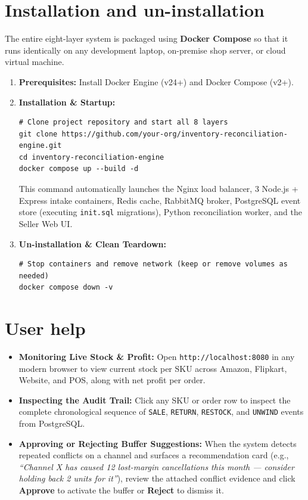 \documentclass[oneside,a4paper,12pt]{report}
\begin{document}
\section{Installation and un-installation}
The entire eight-layer system is packaged using \textbf{Docker Compose} so that it runs identically on any development laptop, on-premise shop server, or cloud virtual machine.
\begin{enumerate}
  \item \textbf{Prerequisites:} Install Docker Engine (v24+) and Docker Compose (v2+).
  \item \textbf{Installation \& Startup:}
  \begin{lstlisting}
# Clone project repository and start all 8 layers
git clone https://github.com/your-org/inventory-reconciliation-engine.git
cd inventory-reconciliation-engine
docker compose up --build -d
  \end{lstlisting}
  This command automatically launches the Nginx load balancer, 3 Node.js + Express intake containers, Redis cache, RabbitMQ broker, PostgreSQL event store (executing \texttt{init.sql} migrations), Python reconciliation worker, and the Seller Web UI.
  \item \textbf{Un-installation \& Clean Teardown:}
  \begin{lstlisting}
# Stop containers and remove network (keep or remove volumes as needed)
docker compose down -v
  \end{lstlisting}
\end{enumerate}

\section{User help}
\begin{itemize}
  \item \textbf{Monitoring Live Stock \& Profit:} Open \texttt{http://localhost:8080} in any modern browser to view current stock per SKU across Amazon, Flipkart, Website, and POS, along with net profit per order.
  \item \textbf{Inspecting the Audit Trail:} Click any SKU or order row to inspect the complete chronological sequence of \texttt{SALE}, \texttt{RETURN}, \texttt{RESTOCK}, and \texttt{UNWIND} events from PostgreSQL.
  \item \textbf{Approving or Rejecting Buffer Suggestions:} When the system detects repeated conflicts on a channel and surfaces a recommendation card (e.g., \textit{``Channel X has caused 12 lost-margin cancellations this month — consider holding back 2 units for it''}), review the attached conflict evidence and click \textbf{Approve} to activate the buffer or \textbf{Reject} to dismiss it.
\end{itemize}
\end{document}
